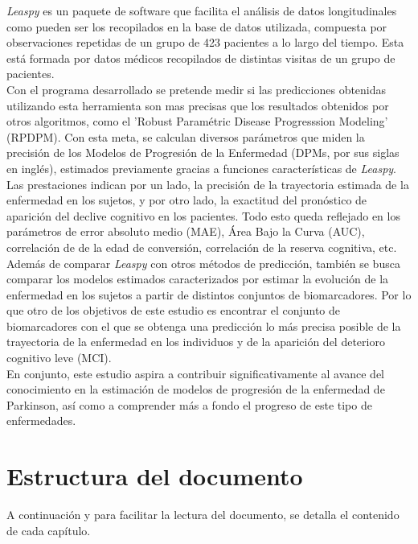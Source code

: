 \textit{Leaspy} es un paquete de software que facilita el análisis de datos longitudinales como pueden ser los recopilados en la base de datos utilizada, compuesta por observaciones repetidas de un grupo de 423 pacientes a lo largo del tiempo. Esta está formada por datos médicos recopilados de distintas visitas de un grupo de pacientes. \\

Con el programa desarrollado se pretende medir si las predicciones obtenidas utilizando esta herramienta son mas precisas que los resultados obtenidos por otros algoritmos, como el 'Robust Paramétric Disease Progresssion Modeling' (RPDPM). Con esta meta, se calculan diversos parámetros que miden la precisión de los Modelos de Progresión de la Enfermedad (DPMs, por sus siglas en inglés), estimados previamente gracias a funciones características de \textit{Leaspy}. Las prestaciones indican por un lado, la precisión de la trayectoria estimada de la enfermedad en los sujetos, y por otro lado, la exactitud del pronóstico de aparición del declive cognitivo en los pacientes. Todo esto queda reflejado en los parámetros de error absoluto medio (MAE), Área Bajo la Curva (AUC), correlación de de la edad de conversión, correlación de la reserva cognitiva, etc. \\

Además de comparar \textit{Leaspy} con otros métodos de predicción, también se busca comparar los modelos estimados caracterizados por estimar la evolución de la enfermedad en los sujetos a partir de distintos conjuntos de biomarcadores. Por lo que otro de los objetivos de este estudio es encontrar el conjunto de biomarcadores con el que se obtenga una predicción lo más precisa posible de la trayectoria de la enfermedad en los individuos y de la aparición del deterioro cognitivo leve (MCI).\\

En conjunto, este estudio aspira a contribuir significativamente al avance del conocimiento en la estimación de modelos de progresión de la enfermedad de Parkinson, así como a comprender más a fondo el progreso de este tipo de enfermedades.


\section{Estructura del documento}

A continuación y para facilitar la lectura del documento, se detalla el contenido de cada capítulo.

